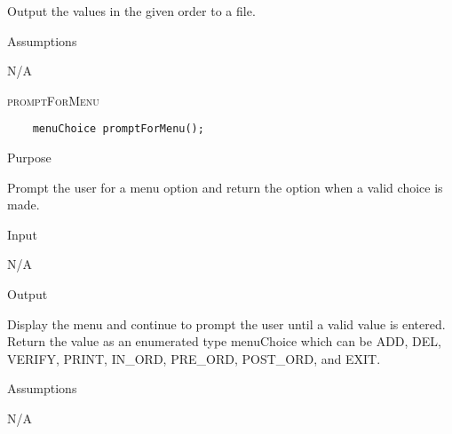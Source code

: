 \documentclass[pdftex, 12pt]{article}
\begin{document}
\begin{description}
\begin{description}
				Output the values in the given order to a file.

			\item{Assumptions}

				N/A

		\end{description}
	\item{\textsc{promptForMenu}}
\begin{lstlisting}
	menuChoice promptForMenu();
\end{lstlisting}
		\begin{description}

			\item{Purpose}

				Prompt the user for a menu option and return the option when a valid choice is made.

			\item{Input}

				N/A

			\item{Output}

				Display the menu and continue to prompt the user until a valid value is entered.  Return the value as an
				enumerated type menuChoice which can be ADD, DEL, VERIFY, PRINT, IN\_ORD, PRE\_ORD, POST\_ORD, and EXIT.

			\item{Assumptions}

				N/A

		\end{description}
\end{description}
\end{document}
